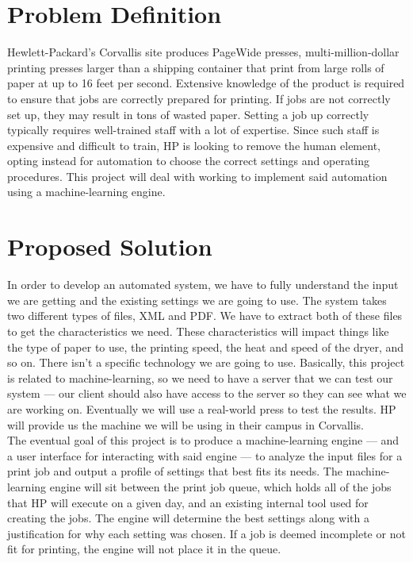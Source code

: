\documentclass[draftclsnofoot,onecolumn,10pt]{IEEEtran}
\begin{document}
\section{Problem Definition}
Hewlett-Packard's Corvallis site produces PageWide presses, multi-million-dollar printing presses larger than a shipping container that print from large rolls of paper at up to 16 feet per second. Extensive knowledge of the product is required to ensure that jobs are correctly prepared for printing. If jobs are not correctly set up, they may result in tons of wasted paper. Setting a job up correctly typically requires well-trained staff with a lot of expertise. Since such staff is expensive and difficult to train, HP is looking to remove the human element, opting instead for automation to choose the correct settings and operating procedures. This project will deal with working to implement said automation using a machine-learning engine.

\bigskip
\section{Proposed Solution}
In order to develop an automated system, we have to fully understand the input we are getting and the existing settings we are going to use. The system takes two different types of files, XML and PDF. We have to extract both of these files to get the characteristics we need. These characteristics will impact things like the type of paper to use, the printing speed, the heat and speed of the dryer, and so on. There isn’t a specific technology we are going to use. Basically, this project is related to machine-learning, so we need to have a server that we can test our system — our client should also have access to the server so they can see what we are working on. Eventually we will use a real-world press to test the results. HP will provide us the machine we will be using in their campus in Corvallis.\\

The eventual goal of this project is to produce a machine-learning engine — and a user interface for interacting with said engine — to analyze the input files for a print job and output a profile of settings that best fits its needs. The machine-learning engine will sit between the print job queue, which holds all of the jobs that HP will execute on a given day, and an existing internal tool used for creating the jobs. The engine will determine the best settings along with a justification for why each setting was chosen. If a job is deemed incomplete or not fit for printing, the engine will not place it in the queue.\\
\end{document}
